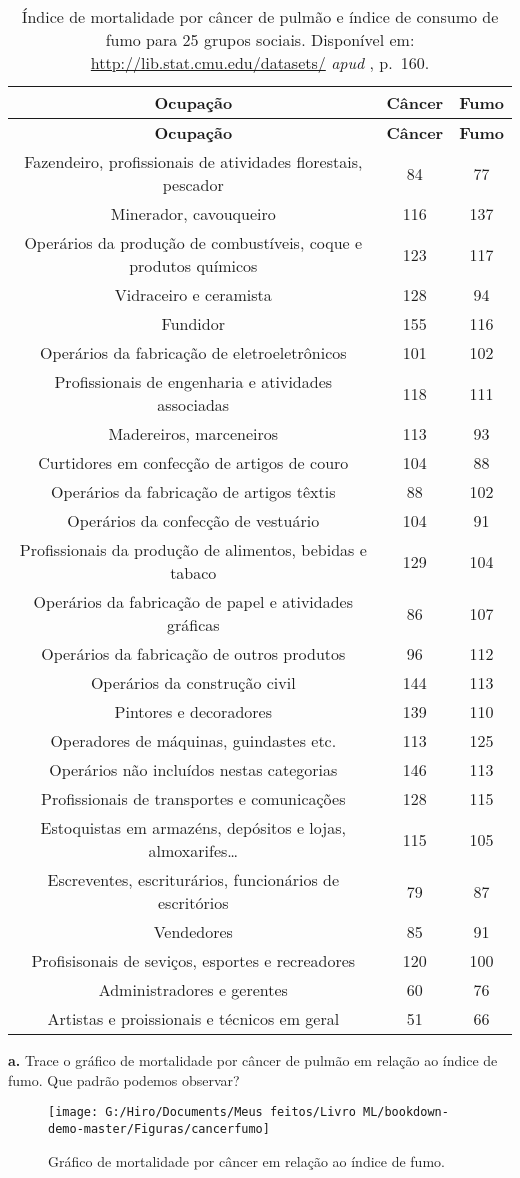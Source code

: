 \documentclass[
  openany]{book}
\begin{document}
\begin{longtable}[]{@{}ccc@{}}
\caption{\label{tab:cancercigarro} Índice de mortalidade por câncer de pulmão e índice de consumo de fumo para 25 grupos sociais. Disponível em: \url{http://lib.stat.cmu.edu/datasets/} \emph{apud} \citep{morettin2017estatistica}, p.~160.}\tabularnewline
\toprule
\textbf{Ocupação} & \textbf{Câncer} & \textbf{Fumo}\tabularnewline
\midrule
\endfirsthead
\toprule
\textbf{Ocupação} & \textbf{Câncer} & \textbf{Fumo}\tabularnewline
\midrule
\endhead
Fazendeiro, profissionais de atividades florestais, pescador & 84 & 77\tabularnewline
Minerador, cavouqueiro & 116 & 137\tabularnewline
Operários da produção de combustíveis, coque e produtos químicos & 123 & 117\tabularnewline
Vidraceiro e ceramista & 128 & 94\tabularnewline
Fundidor & 155 & 116\tabularnewline
Operários da fabricação de eletroeletrônicos & 101 & 102\tabularnewline
Profissionais de engenharia e atividades associadas & 118 & 111\tabularnewline
Madereiros, marceneiros & 113 & 93\tabularnewline
Curtidores em confecção de artigos de couro & 104 & 88\tabularnewline
Operários da fabricação de artigos têxtis & 88 & 102\tabularnewline
Operários da confecção de vestuário & 104 & 91\tabularnewline
Profissionais da produção de alimentos, bebidas e tabaco & 129 & 104\tabularnewline
Operários da fabricação de papel e atividades gráficas & 86 & 107\tabularnewline
Operários da fabricação de outros produtos & 96 & 112\tabularnewline
Operários da construção civil & 144 & 113\tabularnewline
Pintores e decoradores & 139 & 110\tabularnewline
Operadores de máquinas, guindastes etc. & 113 & 125\tabularnewline
Operários não incluídos nestas categorias & 146 & 113\tabularnewline
Profissionais de transportes e comunicações & 128 & 115\tabularnewline
Estoquistas em armazéns, depósitos e lojas, almoxarifes\ldots{} & 115 & 105\tabularnewline
Escreventes, escriturários, funcionários de escritórios & 79 & 87\tabularnewline
Vendedores & 85 & 91\tabularnewline
Profisisonais de seviços, esportes e recreadores & 120 & 100\tabularnewline
Administradores e gerentes & 60 & 76\tabularnewline
Artistas e proissionais e técnicos em geral & 51 & 66\tabularnewline
\bottomrule
\end{longtable}

\newpage

\textbf{a.} Trace o gráfico de mortalidade por câncer de pulmão em relação ao índice de fumo. Que padrão podemos observar?

\begin{figure}

{\centering \texttt{[image: G:/Hiro/Documents/Meus feitos/Livro ML/bookdown-demo-master/Figuras/cancerfumo]} 

}

\caption{Gráfico de mortalidade por câncer em relação ao índice de fumo.}\label{fig:cancerfumo}
\end{figure}
\end{document}
